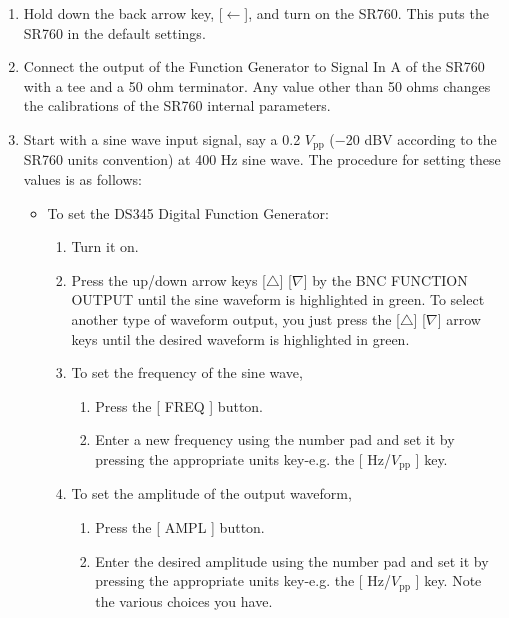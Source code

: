 \documentclass{../lab}
\begin{document}
\begin{enumerate}
    \item Hold down the back arrow key, [$\leftarrow$], and turn on the SR760. This puts the SR760 in the default settings.

    \item Connect the output of the Function Generator to Signal In A of the SR760 with a tee and a 50 ohm terminator. Any value other than 50 ohms changes the calibrations of the SR760 internal parameters.

    \item Start with a sine wave input signal, say a 0.2 $V_\text{pp}$ ($-$20 dBV according to the SR760 units convention) at 400 Hz sine wave. The procedure for setting these values is as follows:
    \begin{itemize}
        \item To set the DS345 Digital Function Generator:
        \begin{enumerate}
            \item Turn it on.

            \item Press the up/down arrow keys [$\triangle$] [$\nabla$] by the BNC FUNCTION OUTPUT until the sine waveform is highlighted in green. To select another type of waveform output, you just press the [$\triangle$] [$\nabla$] arrow keys until the desired waveform is highlighted in green.

            \item To set the frequency of the sine wave,
            \begin{enumerate}
                \item Press the [ FREQ ] button.

                \item Enter a new frequency using the number pad and set it by pressing the appropriate units key-e.g. the [ Hz/$V_\text{pp}$ ] key.

            \end{enumerate}

            \item To set the amplitude of the output waveform,
            \begin{enumerate}
                \item Press the [ AMPL ] button.

                \item Enter the desired amplitude using the number pad and set it by pressing the appropriate units key-e.g. the [ Hz/$V_\text{pp}$ ] key. Note the various choices you have.


\end{enumerate}
\end{enumerate}
\end{itemize}
\end{enumerate}
\end{document}
